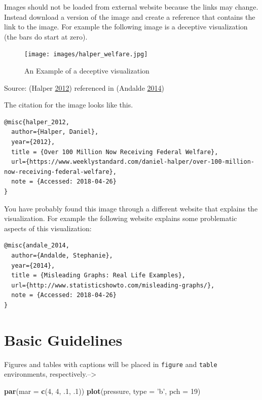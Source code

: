 \documentclass[]{book}
\newenvironment{Shaded}{\begin{snugshade}}{\end{snugshade}}
\newcommand{\KeywordTok}[1]{\textcolor[rgb]{0.13,0.29,0.53}{\textbf{#1}}}
\newcommand{\DataTypeTok}[1]{\textcolor[rgb]{0.13,0.29,0.53}{#1}}
\newcommand{\DecValTok}[1]{\textcolor[rgb]{0.00,0.00,0.81}{#1}}
\newcommand{\StringTok}[1]{\textcolor[rgb]{0.31,0.60,0.02}{#1}}
\newcommand{\NormalTok}[1]{#1}
\begin{document}
Images should not be loaded from external website because the links may
change. Instead download a version of the image and create a reference
that contains the link to the image. For example the following image is
a deceptive visualization (the bars do start at zero).

\begin{figure}
\centering
\texttt{[image: images/halper\_welfare.jpg]}
\caption{An Example of a deceptive visualization}
\end{figure}

Source: (Halper \protect\hyperlink{ref-halper_2012}{2012}) referenced in
(Andalde \protect\hyperlink{ref-andale_2014}{2014})

The citation for the image looks like this.

\begin{verbatim}
@misc{halper_2012,
  author={Halper, Daniel},
  year={2012},
  title = {Over 100 Million Now Receiving Federal Welfare},
  url={https://www.weeklystandard.com/daniel-halper/over-100-million-now-receiving-federal-welfare},
  note = {Accessed: 2018-04-26}
}
\end{verbatim}

You have probably found this image through a different website that
explains the visualization. For example the following website explains
some problematic aspects of this visualization:

\begin{verbatim}
@misc{andale_2014,
  author={Andalde, Stephanie},
  year={2014},
  title = {Misleading Graphs: Real Life Examples},
  url={http://www.statisticshowto.com/misleading-graphs/},
  note = {Accessed: 2018-04-26}
}
\end{verbatim}

\section{Basic Guidelines}\label{basic-guidelines}

Figures and tables with captions will be placed in \texttt{figure} and
\texttt{table} environments, respectively.--\textgreater{}

\begin{Shaded}
\begin{Highlighting}[]
\KeywordTok{par}\NormalTok{(}\DataTypeTok{mar =} \KeywordTok{c}\NormalTok{(}\DecValTok{4}\NormalTok{, }\DecValTok{4}\NormalTok{, .}\DecValTok{1}\NormalTok{, .}\DecValTok{1}\NormalTok{))}
\KeywordTok{plot}\NormalTok{(pressure, }\DataTypeTok{type =} \StringTok{'b'}\NormalTok{, }\DataTypeTok{pch =} \DecValTok{19}\NormalTok{)}
\end{Highlighting}
\end{Shaded}
\end{document}
